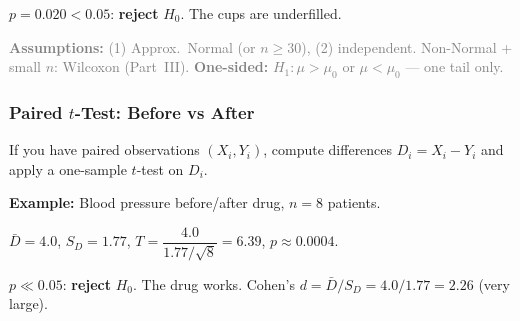 \documentclass[aspectratio=169]{beamer}
\begin{document}
\begin{frame}
\vspace{-0.05cm}
$p = 0.020 < 0.05$: \textbf{reject} $H_0$. The cups are underfilled.

\vspace{0.02cm}
{\scriptsize\textcolor{gray}{\textbf{Assumptions:} (1) Approx.\ Normal (or $n \geq 30$), (2) independent. Non-Normal + small $n$: Wilcoxon (Part~III). \;\textbf{One-sided:} $H_1\!: \mu > \mu_0$ or $\mu < \mu_0$ --- one tail only.}}
\end{frame}

\begin{frame}
\frametitle{Paired $t$-Test: Before vs After}

\small
If you have paired observations $(X_i, Y_i)$, compute differences $D_i = X_i - Y_i$ and apply a one-sample $t$-test on $D_i$.

\vspace{0.1cm}
\begin{center}
\end{center}

\vspace{0.1cm}
\textbf{Example:} Blood pressure before/after drug, $n = 8$ patients.

\vspace{0.1cm}
\begin{center}
\end{center}

\vspace{0.1cm}
$\bar{D} = 4.0$, \;$S_D = 1.77$, \;$T = \dfrac{4.0}{1.77/\sqrt{8}} = 6.39$, \;$p \approx 0.0004$.

\vspace{0.05cm}
$p \ll 0.05$: \textbf{reject} $H_0$. The drug works. \; Cohen's $d = \bar{D}/S_D = 4.0/1.77 = 2.26$ (very large).
\end{frame}
\end{document}
